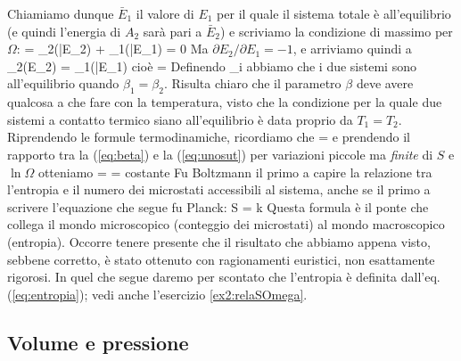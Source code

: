 Chiamiamo dunque $\bar{E}_{1}$ il valore di $E_{1}$ per il quale il sistema totale è all'equilibrio (e quindi l'energia di $A_{2}$ sarà pari a $\bar{E}_{2}$) e scriviamo la condizione di massimo per $\Omega$:
\be
\label{eq:maxomega1}
 = \Omega_{2}(\bar{E_{2}}) + \Omega_{1}(\bar{E}_{1}) = 0
\ee
Ma $\partial E_{2}/\partial E_{1} = -1$, e arriviamo quindi a
\be
\label{eq:maxomega2}
\Omega_{2}(E_{2}) = \Omega_{1}(\bar{E}_{1})
\ee
cioè
\be
\label{eq:maxomega3}
 = 
\ee
Definendo
\be
\label{eq:beta}
\beta_i \equiv {}
\ee
abbiamo che i due sistemi sono all'equilibrio quando $\beta_{1} = \beta_{2}$. Risulta chiaro che il parametro $\beta$ deve avere qualcosa a che fare con la temperatura, visto che la condizione per la quale due sistemi a contatto termico siano all'equilibrio è data proprio da $T_{1} = T_{2}$. Riprendendo le formule termodinamiche, ricordiamo che
\be
\label{eq:unosut}
 = 
\ee
e prendendo il rapporto tra la (\ref{eq:beta}) e la (\ref{eq:unosut}) per variazioni piccole ma {\em finite} di $S$ e $\ln{\Omega}$ otteniamo
\be
\label{eq:deltaomega}
 =  = \mbox{costante}
\ee
Fu Boltzmann il primo a capire la relazione tra l'entropia e il numero dei microstati accessibili al sistema, anche se il primo a scrivere l'equazione che segue fu Planck:
\be
\label{eq:entropia}
S = k\ln \Omega
\ee
Questa formula è il ponte che collega il mondo microscopico (conteggio dei microstati) al mondo macroscopico (entropia). Occorre tenere presente che il risultato che abbiamo appena visto, sebbene corretto, è stato ottenuto con ragionamenti euristici, non esattamente rigorosi. In quel che segue daremo per scontato che l'entropia è definita dall'eq. (\ref{eq:entropia}); vedi anche l'esercizio \ref{ex2:relaSOmega}.

\subsection{Volume e pressione}

